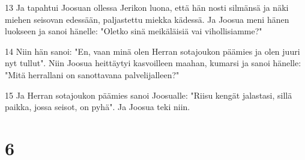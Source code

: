 \par 13 Ja tapahtui Joosuan ollessa Jerikon luona, että hän nosti silmänsä ja näki miehen seisovan edessään, paljastettu miekka kädessä. Ja Joosua meni hänen luokseen ja sanoi hänelle: "Oletko sinä meikäläisiä vai vihollisiamme?"
\par 14 Niin hän sanoi: "En, vaan minä olen Herran sotajoukon päämies ja olen juuri nyt tullut". Niin Joosua heittäytyi kasvoilleen maahan, kumarsi ja sanoi hänelle: "Mitä herrallani on sanottavana palvelijalleen?"
\par 15 Ja Herran sotajoukon päämies sanoi Joosualle: "Riisu kengät jalastasi, sillä paikka, jossa seisot, on pyhä". Ja Joosua teki niin.

\chapter{6}

